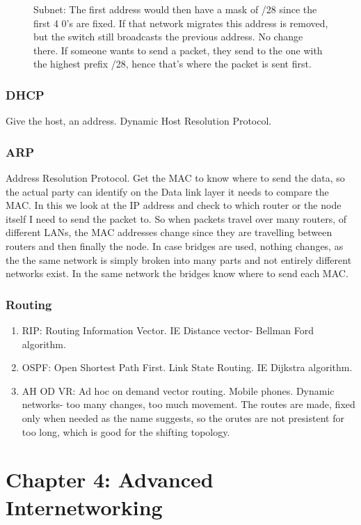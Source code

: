 \documentclass[11pt, a4paper]{article}
\begin{document}
\begin{enumerate}
\begin{figure}[H]
        \caption{Subnet: The first address would then have a mask of /28 since the first 4 0's are fixed. If that network migrates this address is removed, but the switch still broadcasts the previous address. No change there. If someone wants to send a packet, they send to the one with the highest prefix /28, hence that's where the packet is sent first.}
        \label{fig:my_label}
    \end{figure}
\end{enumerate}
\subsubsection{DHCP}
Give the host, an address. Dynamic Host Resolution Protocol.

\subsubsection{ARP}
Address Resolution Protocol. Get the MAC to know where to send the data, so the actual party can identify on the Data link layer it needs to compare the MAC. In this we look at the IP address and check to which router or the node itself I need to send the packet to. So when packets travel over many routers, of different LANs, the MAC addresses change since they are travelling between routers and then finally the node. In case bridges are used, nothing changes, as the the same network is simply broken into many parts and not entirely different networks exist. In the same network the bridges know where to send each MAC.

\subsubsection{Routing}
\begin{enumerate}
    \item RIP: Routing Information Vector. IE Distance vector- Bellman Ford algorithm.
    \item OSPF: Open Shortest Path First. Link State Routing. IE Dijkstra algorithm.
    \item AH OD VR: Ad hoc on demand vector routing. Mobile phones. Dynamic networks- too many changes, too much movement. The routes are made, fixed only when needed as the name suggests, so the orutes are not presistent for too long, which is good for the shifting topology.
\end{enumerate}

\section{Chapter 4: Advanced Internetworking}
\end{document}
